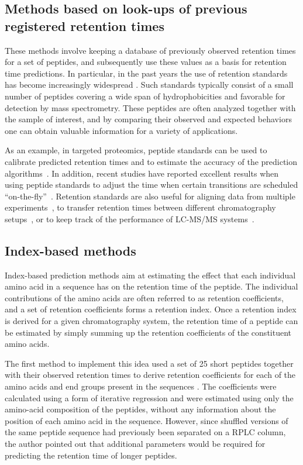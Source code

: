 \documentclass[a4paper]{article}
\begin{document}
\subsection{Methods based on look-ups of previous registered retention times}

These methods involve keeping a database of previously observed
retention times for a set of peptides, and subsequently use these
values as a basis for retention time predictions. In particular, in
the past years the use of retention standards has become increasingly
widespread \cite{olegstd, irt}. Such standards typically consist of a
small number of peptides covering a wide span of hydrophobicities and
favorable for detection by mass spectrometry. These peptides are often
analyzed together with the sample of interest, and by comparing their
observed and expected behaviors one can obtain valuable information
for a variety of applications.

\vspace{0.15cm}

As an example, in targeted proteomics, peptide standards can be used to
 calibrate predicted retention times and to estimate the accuracy of
 the prediction algorithms~\cite{Kiyonami01022011}. In addition,
 recent studies have reported excellent results when using peptide
 standards to adjust the time when certain transitions are scheduled
 ``on-the-fly''~\cite{seb, irt}. Retention standards are also useful
 for aligning data from multiple experiments~\cite{petritis2003}, to
 transfer retention times between different chromatography
 setups~\cite{seb}, or to keep track of the performance of LC-MS/MS
 systems~\cite{qcal}.

\subsection{Index-based methods}
\label{sec:irt}

Index-based prediction methods aim at estimating the effect that each
individual amino acid in a sequence has on the retention time of the
peptide. The individual contributions of the amino acids are often
referred to as retention coefficients, and a set of retention
coefficients forms a retention index. Once a retention index is
derived for a given chromatography system, the retention time of a
peptide can be estimated by simply summing up the retention
coefficients of the constituent amino acids.

The first method to implement this idea used a set of 25 short
peptides together with their observed retention times to derive
retention coefficients for each of the amino acids and end groups
present in the sequences \cite{meek1980}. The coefficients were
calculated using a form of iterative regression and were estimated
using only the amino-acid composition of the peptides, without any
information about the position of each amino acid in the
sequence. However, since shuffled versions of the same peptide
sequence had previously been separated on a RPLC column, the author
pointed out that additional parameters would be required for
predicting the retention time of longer peptides.
\end{document}
